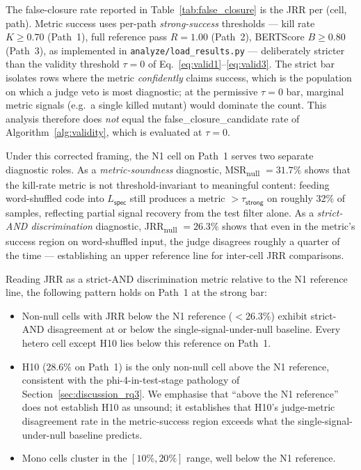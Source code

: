 The false-closure rate reported in Table~\ref{tab:false_closure} is the JRR per (cell, path). Metric success uses per-path \emph{strong-success} thresholds --- kill rate $K \geq 0.70$ (Path~1), full reference pass $R = 1.00$ (Path~2), BERTScore $B \geq 0.80$ (Path~3), as implemented in \texttt{analyze/load\_results.py} --- deliberately stricter than the validity threshold $\tau = 0$ of Eq.~\ref{eq:valid1}--\ref{eq:valid3}. The strict bar isolates rows where the metric \emph{confidently} claims success, which is the population on which a judge veto is most diagnostic; at the permissive $\tau = 0$ bar, marginal metric signals (e.g.\ a single killed mutant) would dominate the count. This analysis therefore does \emph{not} equal the \textsf{false\_closure\_candidate} rate of Algorithm~\ref{alg:validity}, which is evaluated at $\tau = 0$.

Under this corrected framing, the N1 cell on Path~1 serves two separate diagnostic roles. As a \emph{metric-soundness} diagnostic, MSR\textsubscript{null} $= 31.7\%$ shows that the kill-rate metric is not threshold-invariant to meaningful content: feeding word-shuffled code into $L_{\textsf{spec}}$ still produces a metric $> \tau_{\textsf{strong}}$ on roughly 32\% of samples, reflecting partial signal recovery from the test filter alone. As a \emph{strict-AND discrimination} diagnostic, JRR\textsubscript{null} $= 26.3\%$ shows that even in the metric's success region on word-shuffled input, the judge disagrees roughly a quarter of the time --- establishing an upper reference line for inter-cell JRR comparisons.

Reading JRR as a strict-AND discrimination metric relative to the N1 reference line, the following pattern holds on Path~1 at the strong bar:

\begin{itemize}
  \item Non-null cells with JRR below the N1 reference ($< 26.3\%$) exhibit strict-AND disagreement at or below the single-signal-under-null baseline. Every hetero cell except H10 lies below this reference on Path~1.
  \item H10 ($28.6\%$ on Path~1) is the only non-null cell above the N1 reference, consistent with the phi-4-in-test-stage pathology of Section~\ref{sec:discussion_rq3}. We emphasise that ``above the N1 reference'' does not establish H10 as unsound; it establishes that H10's judge-metric disagreement rate in the metric-success region exceeds what the single-signal-under-null baseline predicts.
  \item Mono cells cluster in the $[10\%, 20\%]$ range, well below the N1 reference.
\end{itemize}


